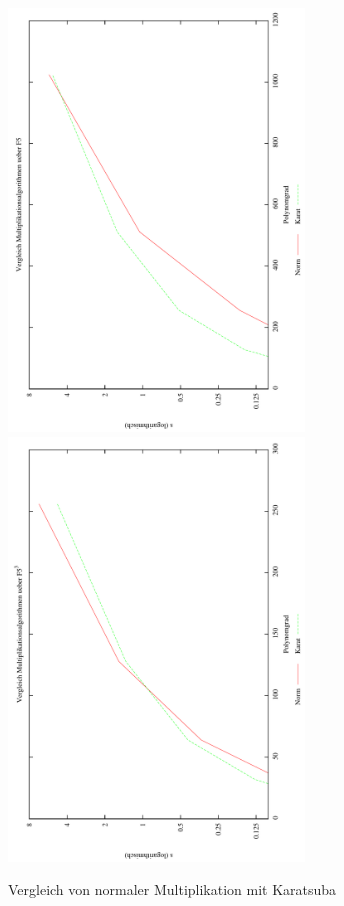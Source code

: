 \begin{figure}
  \caption{Vergleich von normaler Multiplikation mit Karatsuba}
  \label{fig:karavsnorm}
  \centering
  \includegraphics[angle=-90,width=0.7\textwidth]{plots/benchNormVsKara_F5.pdf}
  \includegraphics[angle=-90,width=0.7\textwidth]{plots/benchNormVsKara_F53.pdf}
\end{figure}


